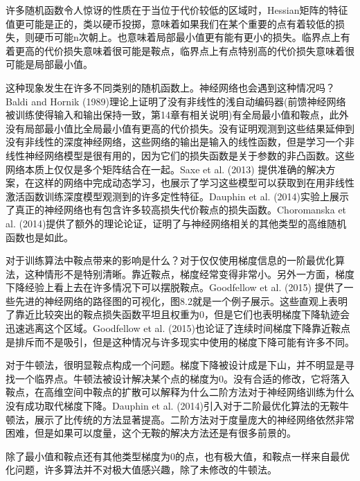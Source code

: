 许多随机函数令人惊讶的性质在于当位于代价较低的区域时，Hessian矩阵的特征值更可能是正的，类以硬币投掷，意味着如果我们在某个重要的点有着较低的损失，则硬币可能n次朝上。也意味着局部最小值更有能有更小的损失。临界点上有着更高的代价损失意味着很可能是鞍点，临界点上有点特别高的代价损失意味着很可能是局部最小值。

这种现象发生在许多不同类别的随机函数上。神经网络也会遇到这种情况吗？Baldi and Hornik (1989)理论上证明了没有非线性的浅自动编码器(前馈神经网络被训练使得输入和输出保持一致，第14章有相关说明)有全局最小值和鞍点，此外没有局部最小值比全局最小值有更高的代价损失。没有证明观测到这些结果延伸到没有非线性的深度神经网络，这些网络的输出是输入的线性函数，但是学习一个非线性神经网络模型是很有用的，因为它们的损失函数是关于参数的非凸函数。这些网络本质上仅仅是多个矩阵结合在一起。Saxe et al. (2013) 提供准确的解决方案，在这样的网络中完成动态学习，也展示了学习这些模型可以获取到在用非线性激活函数训练深度模型观测到的许多定性特征。Dauphin et al. (2014)实验上展示了真正的神经网络也有包含许多较高损失代价鞍点的损失函数。Choromanska et al. (2014)提供了额外的理论论证，证明了与神经网络相关的其他类型的高维随机函数也是如此。

对于训练算法中鞍点带来的影响是什么？对于仅仅使用梯度信息的一阶最优化算法，这种情形不是特别清晰。靠近鞍点，梯度经常变得非常小。另外一方面，梯度下降经验上看上去在许多情况下可以摆脱鞍点。Goodfellow et al. (2015) 提供了一些先进的神经网络的路径图的可视化，图8.2就是一个例子展示。这些直观上表明了靠近比较突出的鞍点损失函数平坦且权重为0，但是它们也表明梯度下降轨迹会迅速逃离这个区域。Goodfellow et al. (2015)也论证了连续时间梯度下降靠近鞍点是排斥而不是吸引，但是这种情况与许多现实中使用的梯度下降可能有许多不同。


对于牛顿法，很明显鞍点构成一个问题。梯度下降被设计成是下山，并不明显是寻找一个临界点。牛顿法被设计解决某个点的梯度为0。没有合适的修改，它将落入鞍点，在高维空间中鞍点的扩散可以解释为什么二阶方法对于神经网络训练为什么没有成功取代梯度下降。Dauphin et al. (2014)引入对于二阶最优化算法的无鞍牛顿法，展示了比传统的方法显著提高。二阶方法对于度量庞大的神经网络依然非常困难，但是如果可以度量，这个无鞍的解决方法还是有很多前景的。

除了最小值和鞍点还有其他类型梯度为0的点，也有极大值，和鞍点一样来自最优化问题，许多算法并不对极大值感兴趣，除了未修改的牛顿法。

